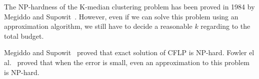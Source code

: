 \documentclass[10pt,journal,compsoc]{IEEEtran}
\begin{document}

The NP-hardness of the K-median clustering problem has been proved in 1984 by Megiddo and Supowit~\cite{1984}. 
However, even if we can solve this problem using an approximation algorithm, we still have to decide a reasonable $k$ regarding to the total budget. 



Megiddo and Supowit~\cite{1984} proved that exact solution of CFLP is NP-hard. Fowler el al.~\cite{FOWLER1981133} proved that when the error is small, even an approximation to this problem is NP-hard.
\end{document}

